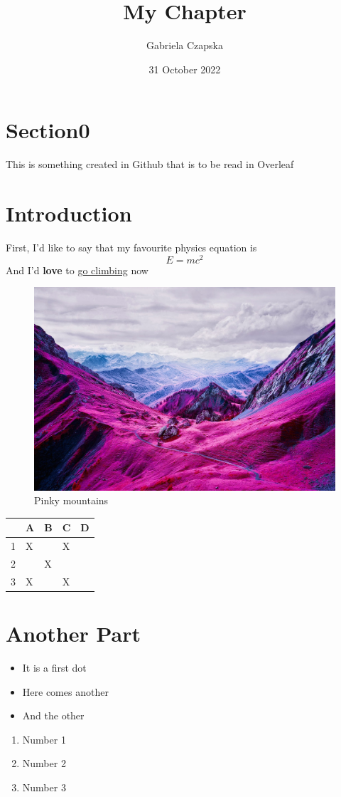 \documentclass{article}
\title{My Chapter}
\author
{Gabriela Czapska}
\date{31 October 2022}
\begin{document}
\maketitle
\tableofcontents

\section{Section0}
This is something created in Github that is to be read in Overleaf

\section{Introduction}
First, I'd like to say that my favourite physics equation is 
\[E=mc^2\]
And I'd \textbf{love} to \underline{go climbing} now

\begin{figure}[h!]
\includegraphics[width=\linewidth]{Pictures/mountains.jpg}
\caption{Pinky mountains}
  \label{fig:mountains}
\end{figure}


\begin{table}[]
\begin{tabular}{|l|l|l|l|l|}
\hline
\rowcolor[HTML]{DAE8FC} 
                          & A & B & C & D \\ \hline
\cellcolor[HTML]{DAE8FC}1 & X &   & X &   \\ \hline
\cellcolor[HTML]{DAE8FC}2 &   & X &   &   \\ \hline
\cellcolor[HTML]{DAE8FC}3 & X &   & X &   \\ \hline
\end{tabular}
\end{table}

\section{Another Part}
\centering

\begin{itemize}
  \item It is a first dot
  \item Here comes another
  \item And the other
\end{itemize}
\begin{enumerate}
  \item Number 1
  \item Number 2
  \item Number 3
\end{enumerate}
\end{document}
